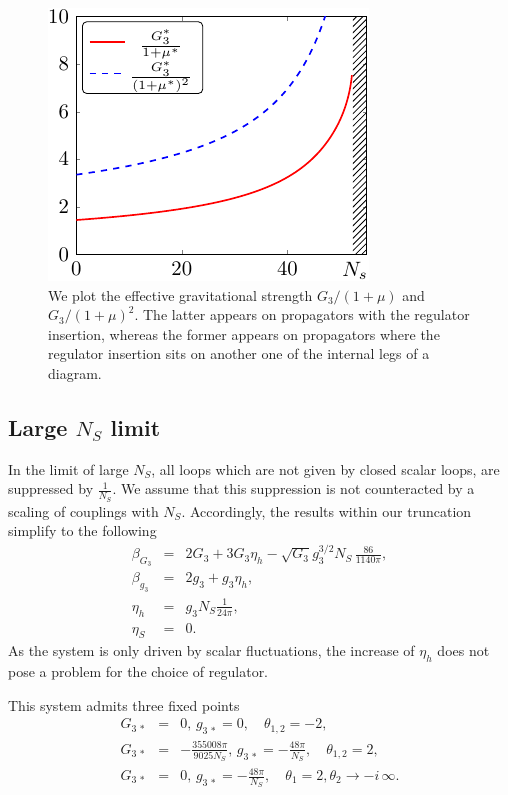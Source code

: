 \documentclass[11pt]{book} %
\newcommand{\bea}{\begin{eqnarray}}
\newcommand{\eea}{\end{eqnarray}}
\begin{document}
%
\begin{figure}
\includegraphics[width=\linewidth]{NS_findiff_all_hss_eff_g_only_ns-crop.pdf}
\caption{\label{fig:effectiveG} We plot the effective gravitational
  strength $G_3/(1+\mu)$ and $G_3/(1+\mu)^2$. The latter appears
  on propagators with the regulator insertion, whereas the former
  appears on propagators where the regulator insertion sits on another
  one of the internal legs of a diagram.}
\end{figure}
%
%
\subsection{Large $N_S$ limit}
%
In the limit of large $N_S$, all loops which are not given by closed
scalar loops, are suppressed by $\frac{1}{N_S}$. We assume that this
suppression is not counteracted by a scaling of couplings with $N_S$.
Accordingly, the results within our truncation simplify to the
following
%
\bea
\beta_{G_3} &=& 2 G_3 + 3 G_3 \eta_h - \sqrt{G_3}g_3^{3/2}N_S\, \frac{86}{1140 \pi},\\
\beta_{g_3}&=& 2 g_3 + g_3 \eta_h,\\
\eta_h &=& g_3 N_S \frac{1}{24 \pi},\\
\eta_S&=&0.  \eea
%
As the system is only driven by scalar fluctuations, the increase of
$\eta_h$ does not pose a problem for the choice of regulator.

This system admits three fixed points \bea
G_{3\, \ast}&=&0,\, g_{3\, \ast}= 0,\quad \theta_{1,2} =-2,\\
G_{3\, \ast}&=&-\frac{355008 \pi}{9025 N_S},\, g_{3\, \ast}= -\frac{48 \pi}{N_S},\quad \theta_{1,2} =2,\\
G_{3\, \ast}&=&0,\, g_{3\, \ast}= -\frac{48 \pi}{N_S},\quad
\theta_1=2, \theta_2 \rightarrow - i\, \infty .  \eea
\end{document}

